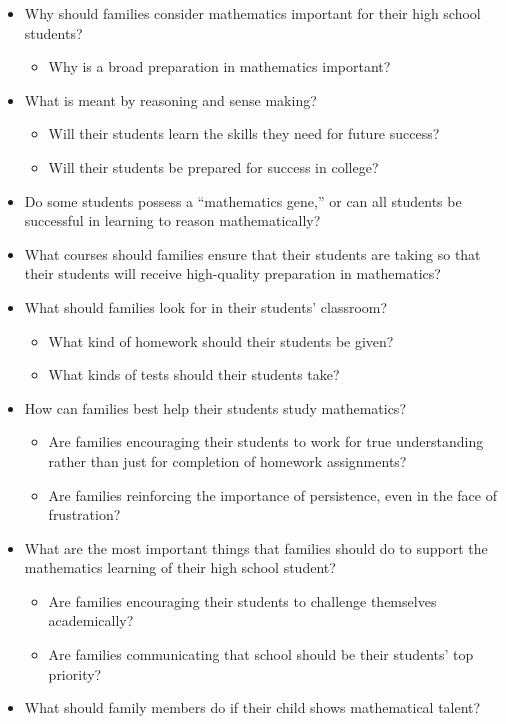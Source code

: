 \documentclass[
  10pt,
  a4paper,
  landscape,
  twoside,
  openany
]{scrbook}
\newcommand{\EN}[1]{#1}
\begin{document}
\TriPara
{
\EN{
  \begin{itemize}
    \item Why should families consider mathematics important for their high school students?
      \begin{itemize}
        \item Why is a broad preparation in mathematics important?
      \end{itemize}
    \item What is meant by reasoning and sense making?
      \begin{itemize}
        \item Will their students learn the skills they need for future success?
        \item Will their students be prepared for success in college?
      \end{itemize}
    \item Do some students possess a ``mathematics gene,'' or can all students be successful in learning to reason mathematically?
    \item What courses should families ensure that their students are taking so that their students will receive high-quality preparation in mathematics?
    \item What should families look for in their students' classroom?
      \begin{itemize}
        \item What kind of homework should their students be given?
        \item What kinds of tests should their students take?
      \end{itemize}
    \item How can families best help their students study mathematics?
      \begin{itemize}
        \item Are families encouraging their students to work for true understanding rather than just for completion of homework assignments?
        \item Are families reinforcing the importance of persistence, even in the face of frustration?
      \end{itemize}
    \item What are the most important things that families should do to support the mathematics learning of their high school student?
      \begin{itemize}
        \item Are families encouraging their students to challenge themselves academically?
        \item Are families communicating that school should be their students' top priority?
      \end{itemize}
    \item What should family members do if their child shows mathematical talent?
  \end{itemize}}
}
\end{document}
